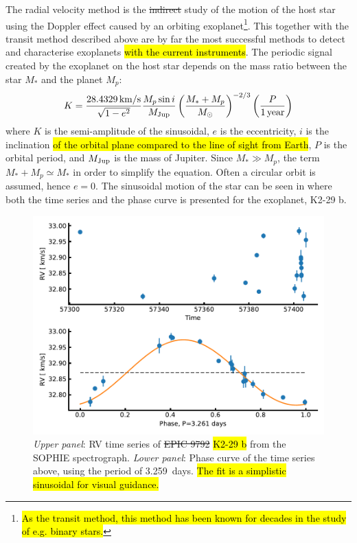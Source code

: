 The radial velocity method is the \st{indirect} study of the motion of the host star using the
Doppler effect caused by an orbiting exoplanet\footnote{\hl{As the transit method, this method has
been known for decades in the study of e.g. binary stars.}}. This together with the transit method
described above are by far the most successful methods to detect and characterise exoplanets \hl{
with the current instruments}. The periodic signal created by the exoplanet on the host star depends
on the mass ratio between the star $M_\ast$ and the planet $M_p$:
\begin{align}
  K = \frac{\SI{28.4329}{km/s}}{\sqrt{1-e^2}} \frac{M_p\sin i}{M_\mathrm{Jup}} \left( \frac{M_\ast+M_p}{M_\odot} \right)^{-2/3} \left(\frac{P}{\SI{1}{year}}\right)  \label{eq:rv}
\end{align}
where $K$ is the semi-amplitude of the sinusoidal, $e$ is the eccentricity, $i$ is the inclination
\hl{of the orbital plane compared to the line of sight from Earth}, $P$ is the orbital period, and
$M_\mathrm{Jup}$ is the mass of Jupiter. Since $M_\ast \gg M_p$, the term $M_\ast+M_p\simeq M_\ast$ in order
to simplify the equation. Often a circular orbit is assumed, hence $e=0$. The sinusoidal motion of
the star can be seen in  where both the time series and the phase curve is
presented for the exoplanet, K2-29 b.

\begin{figure}[htpb!]
    \centering
    \includegraphics[width=1.0\linewidth]{figures/RVmethod.pdf}
    \caption{\emph{Upper panel}: RV time series of \st{EPIC 9792} \hl{K2-29 b} from the SOPHIE spectrograph.
             \emph{Lower panel}: Phase curve of the time series above, using the period of
             \SI{3.259}{days}. \hl{The fit is a simplistic sinusoidal for visual guidance.}}
    \label{fig:rvmethod}
\end{figure}

